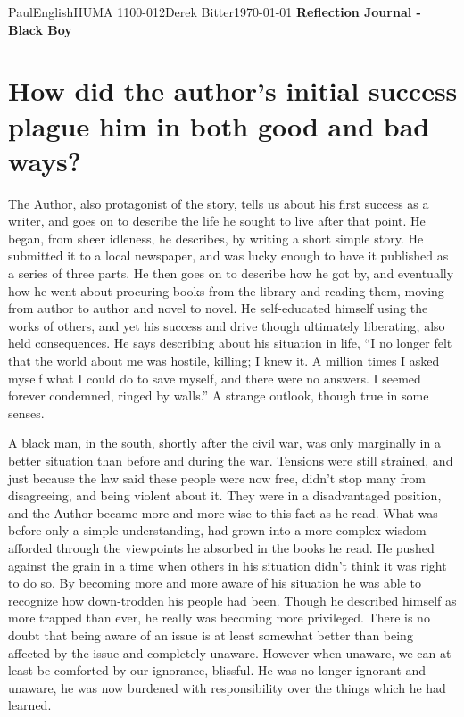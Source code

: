 \documentclass[12pt,letterpaper]{article}
\begin{document}
\begin{mla}{Paul}{English}{HUMA 1100-012}{Derek
    Bitter}{\today}    
    {\textbf{Reflection Journal - Black Boy}}

\section*{How did the author's initial success plague him in both good and bad ways?}

The Author, also protagonist of the story, tells us about his first success as a writer, and goes on to describe the life he sought to live after that point. He began, from sheer idleness, he describes, by writing a short simple story. He submitted it to a local newspaper, and was lucky enough to have it published as a series of three parts. He then goes on to describe how he got by, and eventually how he went about procuring books from the library and reading them, moving from author to author and novel to novel. He self-educated himself using the works of others, and yet his success and drive though ultimately liberating, also held consequences. He says describing about his situation in life, ``I no longer felt that the world about me was hostile, killing; I knew it. A million times I asked myself what I could do to save myself, and there were no answers. I seemed forever condemned, ringed by walls.'' A strange outlook, though true in some senses. 

A black man, in the south, shortly after the civil war, was only marginally in a better situation than before and during the war. Tensions were still strained, and just because the law said these people were now free, didn't stop many from disagreeing, and being violent about it. They were in a disadvantaged position, and the Author became more and more wise to this fact as he read. What was before only a simple understanding, had grown into a more complex wisdom afforded through the viewpoints he absorbed in the books he read. He pushed against the grain in a time when others in his situation didn't think it was right to do so. By becoming more and more aware of his situation he was able to recognize how down-trodden his people had been. Though he described himself as more trapped than ever, he really was becoming more privileged. There is no doubt that being aware of an issue is at least somewhat better than being affected by the issue and completely unaware. However when unaware, we can at least be comforted by our ignorance, blissful. He was no longer ignorant and unaware, he was now burdened with responsibility over the things which he had learned.



\end{mla}
\end{document}
